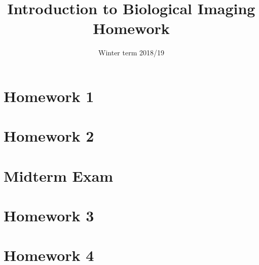 \documentclass{article}
\title{Introduction to Biological Imaging\\Homework}
\author{}%
\date{Winter term 2018/19}
\begin{document}
    \maketitle
    
    \tableofcontents    
     \section{Homework 1}
     
     
     \section{Homework 2}
     
     
     \section*{Midterm Exam}
     
     \section{Homework 3}
     
     
    \section{Homework 4}
    
    
    
    
\end{document}
